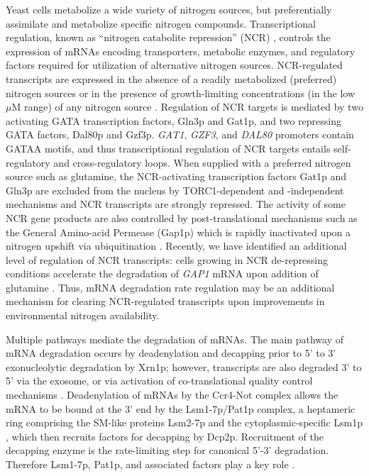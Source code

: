 Yeast cells metabolize a wide variety of nitrogen sources, but
preferentially assimilate and metabolize specific nitrogen compounds.
Transcriptional regulation, known as
“nitrogen catabolite repression” (NCR)
\parencite{magasanik2002nitrogen},
controls the expression of mRNAs
encoding transporters, metabolic enzymes, and regulatory
factors required for utilization of alternative nitrogen sources. 
NCR-regulated transcripts are expressed in the
absence of a readily metabolized (preferred) nitrogen sources or in
the presence of growth-limiting concentrations (in the low $\mu$M range)
of any nitrogen source \parencite{godard2007effect,airoldi2016steady}. Regulation
of NCR targets is mediated by two activating GATA
transcription factors, Gln3p and Gat1p, and two repressing
GATA factors, Dal80p and Gzf3p. \textit{GAT1}, \textit{GZF3}, and
\textit{DAL80} promoters
contain GATAA motifs, and thus transcriptional regulation of NCR
targets entails self-regulatory and cross-regulatory loops. When
supplied with a preferred nitrogen source such as glutamine, the
NCR-activating transcription factors Gat1p and Gln3p are excluded from
the nucleus by TORC1-dependent and -independent mechanisms
\parencite{beck1999tor,tate2013five,tate2017general} and NCR transcripts are strongly
repressed. The activity of some NCR gene
products are also controlled by post-translational mechanisms
\parencite{cooper1983function} such as the General Amino-acid Permease
(Gap1p) which is rapidly inactivated upon a nitrogen 
upshift via ubiquitination
\parencite{stanbrough1995transcriptional,risinger2006activity,merhi2012internal}. Recently, we have
identified an additional level of regulation of NCR transcripts: cells
growing in NCR de-repressing conditions accelerate the degradation
of \textit{GAP1} %
mRNA upon addition of glutamine
\parencite{airoldi2016steady}. Thus, mRNA degradation rate regulation may be an
additional mechanism for clearing NCR-regulated transcripts upon 
improvements in environmental nitrogen availability.

Multiple pathways mediate the degradation of mRNAs. The main pathway
of mRNA degradation occurs by deadenylation and decapping
prior to 5' to 3' exonucleolytic degradation by Xrn1p; however,
transcripts are also degraded 3' to 5' via the exosome, or via
activation of co-translational quality control mechanisms
\parencite{parker2012rna}. Deadenylation of mRNAs by the Ccr4-Not complex
allows the mRNA to be bound at the 3' end by the 
Lsm1-7p/Pat1p complex, a heptameric
ring comprising the SM-like proteins Lsm2-7p and the
cytoplasmic-specific Lsm1p
\parencite{tharun2000yeast,sharif2013architecture}, which then
recruits factors for decapping by Dcp2p. 
Recruitment of the decapping enzyme \parencite{coller2004eukaryotic} is the 
rate-limiting step for canonical 5'-3' degradation.
Therefore Lsm1-7p, Pat1p,
and associated factors play a key role \parencite{nissan2010decapping}. 

